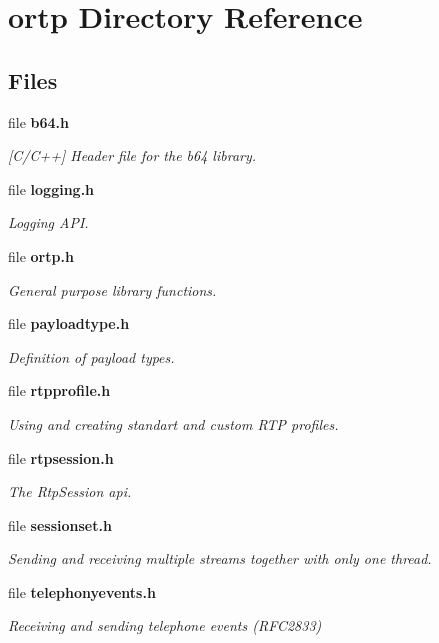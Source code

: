 \section{ortp Directory Reference}
\label{dir_6b9e13dd505c33efa5be7842ff80a53e}
\subsection*{Files}
\begin{DoxyCompactItemize}
\item 
file \textbf{ b64.\+h}
\begin{DoxyCompactList}\small\item\em [C/\+C++] Header file for the b64 library. \end{DoxyCompactList}\item 
file \textbf{ logging.\+h}
\begin{DoxyCompactList}\small\item\em Logging A\+PI. \end{DoxyCompactList}\item 
file \textbf{ ortp.\+h}
\begin{DoxyCompactList}\small\item\em General purpose library functions. \end{DoxyCompactList}\item 
file \textbf{ payloadtype.\+h}
\begin{DoxyCompactList}\small\item\em Definition of payload types. \end{DoxyCompactList}\item 
file \textbf{ rtpprofile.\+h}
\begin{DoxyCompactList}\small\item\em Using and creating standart and custom R\+TP profiles. \end{DoxyCompactList}\item 
file \textbf{ rtpsession.\+h}
\begin{DoxyCompactList}\small\item\em The Rtp\+Session api. \end{DoxyCompactList}\item 
file \textbf{ sessionset.\+h}
\begin{DoxyCompactList}\small\item\em Sending and receiving multiple streams together with only one thread. \end{DoxyCompactList}\item 
file \textbf{ telephonyevents.\+h}
\begin{DoxyCompactList}\small\item\em Receiving and sending telephone events (R\+F\+C2833) \end{DoxyCompactList}\end{DoxyCompactItemize}
